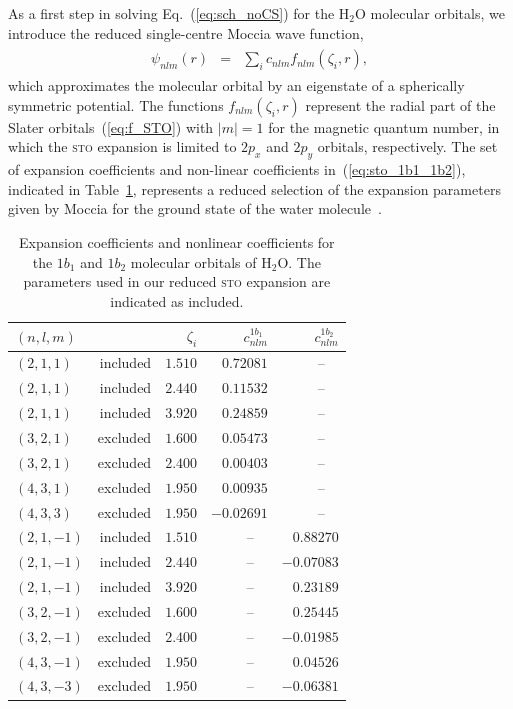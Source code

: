 As a first step in solving Eq.~(\ref{eq:sch_noCS}) for the H$_{2}$O
molecular orbitals, we introduce the reduced single-centre Moccia
wave function,
%
\begin{eqnarray}
  \begin{split}
    \psi_{nlm}(r) & = & \sum\limits_{i}
    c_{nlm} f_{nlm}(\zeta_{i}, r),
    \label{eq:sto_1b1_1b2}
  \end{split}
\end{eqnarray}
%
which approximates the molecular orbital by an eigenstate of a
spherically symmetric potential. The functions $f_{nlm}(\zeta_{i},r)$
represent the radial part of the Slater orbitals~(\ref{eq:f_STO}) with
$|m|=1$ for the magnetic quantum number, in which the \textsc{sto}
expansion is limited to $2p_{x}$ and $2p_{y}$ orbitals,
respectively. The set of expansion coefficients and non-linear
coefficients in~(\ref{eq:sto_1b1_1b2}), indicated in
Table~\ref{tab:1b11b2_coef}, represents a reduced selection of the
expansion parameters given by Moccia for the ground state of the water
molecule~\cite{Moccia_1964}.

\begin{table}[t]
 \centering
  \caption{\label{tab:1b11b2_coef} Expansion coefficients and
    nonlinear coefficients for the $1b_{1}$ and $1b_{2}$ molecular
    orbitals of H$_{2}$O. The parameters used in our reduced
    \textsc{sto} expansion are indicated as included.}
  \begin{tabular}{lrrrr}
    \toprule
    $(n,l, m)$ & & $\zeta_{i}$ & $c_{nlm}^{1b_{1}}$ & $c_{nlm}^{1b_{2}}$ \\
    \midrule
    $(2,1,1)$ & included & $1.510$ & $0.72081$ & --~~ \\
    $(2,1,1)$ & included & $2.440$ & $0.11532$ & --~~ \\
    $(2,1,1)$ & included & $3.920$ & $0.24859$ & --~~ \\
    $(3,2,1)$ & excluded & $1.600$ & $0.05473$ & --~~ \\
    $(3,2,1)$ & excluded & $2.400$ & $0.00403$ & --~~ \\
    $(4,3,1)$ & excluded & $1.950$ & $0.00935$ & --~~ \\
    $(4,3,3)$ & excluded & $1.950$ & $-0.02691$ & --~~ \\
    $(2,1,-1)$ & included & $1.510$ & --~~ & $0.88270$ \\
    $(2,1,-1)$ & included & $2.440$ & --~~ & $-0.07083$ \\
    $(2,1,-1)$ & included & $3.920$ & --~~ & $0.23189$ \\
    $(3,2,-1)$ & excluded & $1.600$ & --~~ & $0.25445$ \\
    $(3,2,-1)$ & excluded & $2.400$ & --~~ & $-0.01985$ \\
    $(4,3,-1)$ & excluded & $1.950$ & --~~ & $0.04526$ \\
    $(4,3,-3)$ & excluded & $1.950$ & --~~ & $-0.06381$ \\
    \bottomrule
  \end{tabular}
\end{table}

